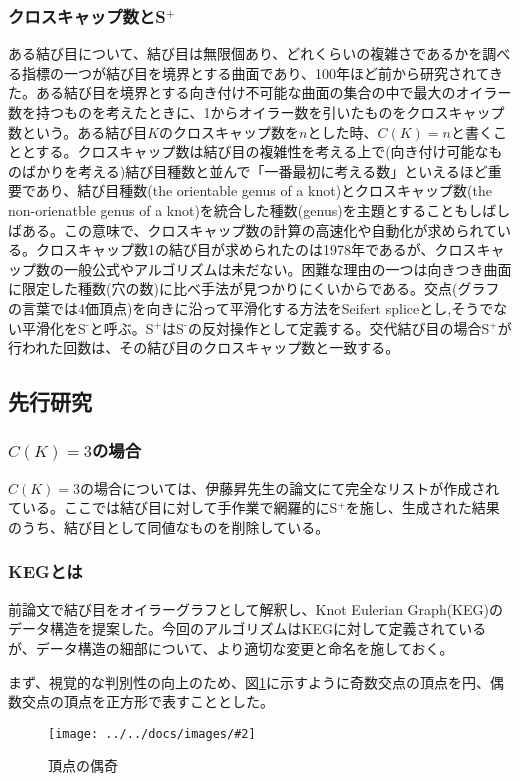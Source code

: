\documentclass[11pt,a4j]{jarticle}
\newcommand{\splus}{S${}^\text{+}$}
\newcommand{\sminus}{S${}^\text{-}$}
\newcommand{\image}[4][height=100pt]{%
\begin{figure}[htbp]
    \centering
    \texttt{[image: ../../docs/images/\#2]}
    \caption{#3}
    \label{fig:#4}
\end{figure}%
}
\newcommand{\tops}[2]{\texorpdfstring{#1}{#2}} %
\begin{document}
\subsubsection{クロスキャップ数と\tops{\splus}{splus}}
ある結び目について、結び目は無限個あり、どれくらいの複雑さであるかを調べる指標の一つが結び目を境界とする曲面であり、100年ほど前から研究されてきた。ある結び目を境界とする向き付け不可能な曲面の集合の中で最大のオイラー数を持つものを考えたときに、1からオイラー数を引いたものをクロスキャップ数という。ある結び目$K$のクロスキャップ数を$n$とした時、$C(K)=n$と書くこととする。クロスキャップ数は結び目の複雑性を考える上で(向き付け可能なものばかりを考える)結び目種数と並んで「一番最初に考える数」といえるほど重要であり、結び目種数(the orientable genus of a knot)とクロスキャップ数(the non-orienatble genus of a knot)を統合した種数(genus)を主題とすることもしばしばある。この意味で、クロスキャップ数の計算の高速化や自動化が求められている。クロスキャップ数1の結び目が求められたのは1978年\cite{MR478131}であるが、クロスキャップ数の一般公式やアルゴリズムは未だない。困難な理由の一つは向きつき曲面に限定した種数(穴の数)に比べ手法が見つかりにくいからである。交点(グラフの言葉では4価頂点)を向きに沿って平滑化する方法をSeifert spliceとし,そうでない平滑化を\sminus と呼ぶ。\splus は\sminus の反対操作として定義する。交代結び目の場合\splus が行われた回数は、その結び目のクロスキャップ数と一致する。


\subsection{先行研究}
\subsubsection{\tops{$C(K)=3$}{C(K)=3}の場合}
$C(K)=3$の場合については、伊藤昇先生の論文\cite{ck3}にて完全なリストが作成されている。ここでは結び目に対して手作業で網羅的に\splus を施し、生成された結果のうち、結び目として同値なものを削除している。

\subsubsection{KEGとは}
前論文\cite{keg}で結び目をオイラーグラフとして解釈し、Knot Eulerian Graph(KEG)のデータ構造を提案した。今回のアルゴリズムはKEGに対して定義されているが、データ構造の細部について、より適切な変更と命名を施しておく。

まず、視覚的な判別性の向上のため、図\ref{fig:parity}に示すように奇数交点の頂点を円、偶数交点の頂点を正方形で表すこととした。
\image{about_parity.jpg}{頂点の偶奇}{parity}
\end{document}
